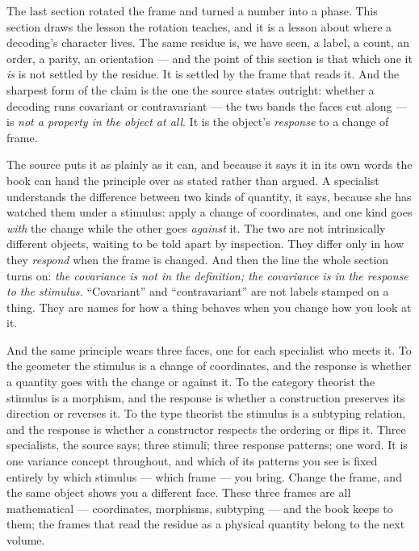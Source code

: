 The last section rotated the frame and turned a number into a phase. This section draws the lesson the rotation
teaches, and it is a lesson about where a decoding's character lives. The same residue is, we have seen, a label, a
count, an order, a parity, an orientation --- and the point of this section is that which one it \emph{is} is not
settled by the residue. It is settled by the frame that reads it. And the sharpest form of the claim is the one the
source states outright: whether a decoding runs covariant or contravariant --- the two bands the faces cut along ---
is \emph{not a property in the object at all}. It is the object's \emph{response} to a change of frame.

The source puts it as plainly as it can, and because it says it in its own words the book can hand the principle over
as stated rather than argued. A specialist understands the difference between two kinds of quantity, it says, because
she has watched them under a stimulus: apply a change of coordinates, and one kind goes \emph{with} the change while
the other goes \emph{against} it. The two are not intrinsically different objects, waiting to be told apart by
inspection. They differ only in how they \emph{respond} when the frame is changed. And then the line the whole section
turns on: \emph{the covariance is not in the definition; the covariance is in the response to the stimulus.}
``Covariant'' and ``contravariant'' are not labels stamped on a thing. They are names for how a thing behaves when you
change how you look at it.

And the same principle wears three faces, one for each specialist who meets it. To the geometer the stimulus is a
change of coordinates, and the response is whether a quantity goes with the change or against it. To the category
theorist the stimulus is a morphism, and the response is whether a construction preserves its direction or reverses it.
To the type theorist the stimulus is a subtyping relation, and the response is whether a constructor respects the
ordering or flips it. Three specialists, the source says; three stimuli; three response patterns; one word. It is one
variance concept throughout, and which of its patterns you see is fixed entirely by which stimulus --- which frame ---
you bring. Change the frame, and the same object shows you a different face. These three frames are all mathematical
--- coordinates, morphisms, subtyping --- and the book keeps to them; the frames that read the residue as a physical
quantity belong to the next volume.

